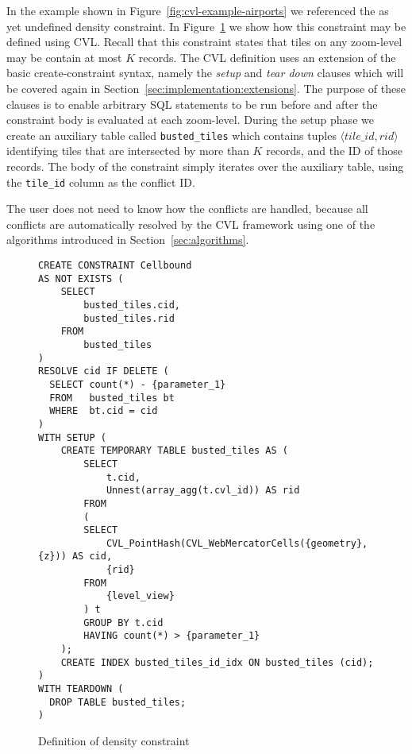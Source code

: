 In the example shown in Figure~\ref{fig:cvl-example-airports} we referenced the as yet undefined density constraint. In Figure~\ref{fig:density:definition} we show how this constraint may be defined using CVL. Recall that this constraint states that tiles on any zoom-level may be contain at most $K$ records. The CVL definition uses an extension of the basic create-constraint syntax, namely the \emph{setup} and \emph{tear down} clauses which will be covered again in Section~\ref{sec:implementation:extensions}. The purpose of these clauses is to enable arbitrary SQL statements to be run before and after the constraint body is evaluated at each zoom-level. During the setup phase we create an auxiliary table called \texttt{busted\_tiles} which contains tuples $\langle tile\_id, rid \rangle$ identifying tiles that are intersected by more than $K$ records, and the ID of those records. The body of the constraint simply iterates over the auxiliary table, using the \texttt{tile\_id} column as the conflict ID.

The user does not need to know how the conflicts are handled, because all conflicts are automatically resolved by the CVL framework using one of the algorithms introduced in Section~\ref{sec:algorithms}.


\begin{figure}[htbp]
\begin{center}
\begin{lstlisting}
CREATE CONSTRAINT Cellbound
AS NOT EXISTS (
    SELECT
        busted_tiles.cid,
        busted_tiles.rid
    FROM
        busted_tiles
)
RESOLVE cid IF DELETE (
  SELECT count(*) - {parameter_1}
  FROM   busted_tiles bt
  WHERE  bt.cid = cid
)
WITH SETUP (
    CREATE TEMPORARY TABLE busted_tiles AS (
        SELECT
            t.cid,
            Unnest(array_agg(t.cvl_id)) AS rid
        FROM
        (
        SELECT
            CVL_PointHash(CVL_WebMercatorCells({geometry}, {z})) AS cid,
            {rid}
        FROM
            {level_view}
        ) t
        GROUP BY t.cid
        HAVING count(*) > {parameter_1}
    );
    CREATE INDEX busted_tiles_id_idx ON busted_tiles (cid);
)
WITH TEARDOWN (
  DROP TABLE busted_tiles;
)
\end{lstlisting}
\caption{Definition of density constraint}
\label{fig:density:definition}
\end{center}
\end{figure}


